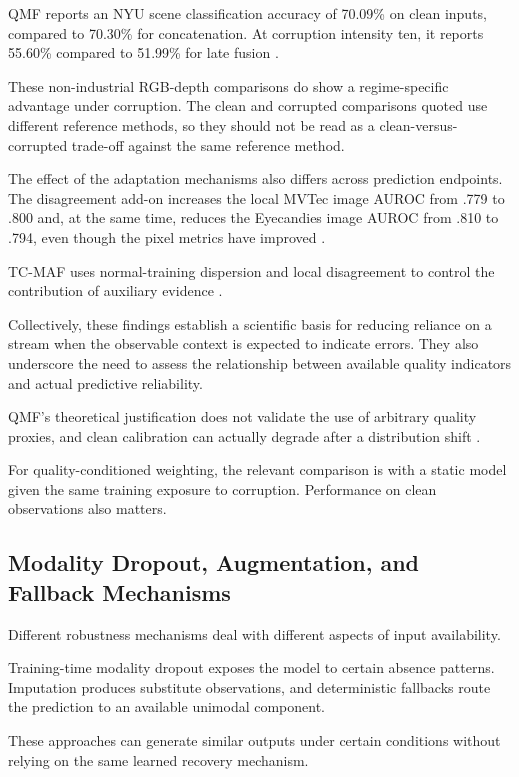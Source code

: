 QMF reports an NYU scene classification accuracy of 70.09\% on clean inputs, compared to 70.30\% for
concatenation. At corruption intensity ten, it reports 55.60\% compared to 51.99\% for late fusion
\parencite[Table~1]{Zhang2023QMF}.

These non-industrial RGB-depth comparisons do show a regime-specific advantage under corruption. The
clean and corrupted comparisons quoted use different reference methods, so they should not be read
as a clean-versus-corrupted trade-off against the same reference method.

The effect of the adaptation mechanisms also differs across prediction endpoints. The disagreement
add-on increases the local MVTec image AUROC from .779 to .800 and, at the same time, reduces the
Eyecandies image AUROC from .810 to .794, even though the pixel metrics have improved \parencite[Tables~4--5]{P033}.

TC-MAF uses normal-training dispersion and local disagreement to control the contribution of
auxiliary evidence \parencite{P026}.

Collectively, these findings establish a scientific basis for reducing reliance on a stream when the
observable context is expected to indicate errors. They also underscore the need to assess the
relationship between available quality indicators and actual predictive reliability.

QMF's theoretical justification does not validate the use of arbitrary quality proxies, and clean
calibration can actually degrade after a distribution shift \parencite{Zhang2023QMF,P008}.

For quality-conditioned weighting, the relevant comparison is with a static model given the same training exposure to corruption. Performance on clean observations also matters.

\subsection{Modality Dropout, Augmentation, and Fallback Mechanisms}

Different robustness mechanisms deal with different aspects of input availability.

Training-time modality dropout exposes the model to certain absence patterns. Imputation produces
substitute observations, and deterministic fallbacks route the prediction to an available unimodal
component.

These approaches can generate similar outputs under certain conditions without relying on the same
learned recovery mechanism.

